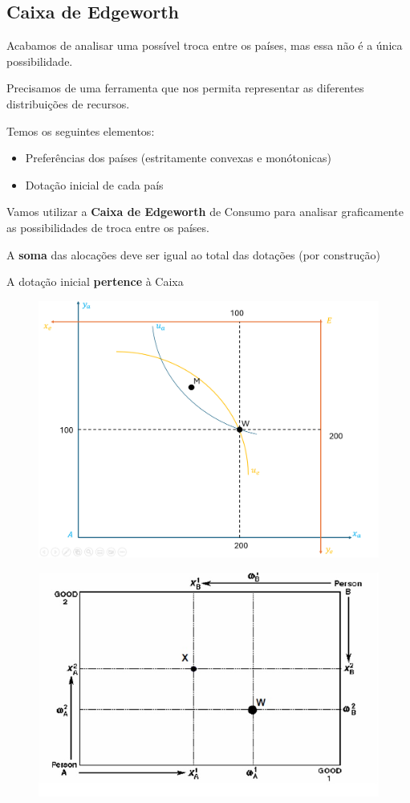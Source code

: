 \documentclass[a4paper,12pt]{article}[abntex2]
\begin{document}
\subsection{\textbf{Caixa de Edgeworth}}

Acabamos de analisar uma possível troca entre os países, mas essa não é a única possibilidade.

Precisamos de uma ferramenta que nos permita representar as diferentes distribuições de recursos.

Temos os seguintes elementos:
\begin{itemize}
    \item Preferências dos países (estritamente convexas e monótonicas)
    \item Dotação inicial de cada país
\end{itemize}

Vamos utilizar a \textbf{Caixa de Edgeworth} de Consumo para analisar graficamente as possibilidades de troca entre os países.


A \textbf{soma} das alocações deve ser igual ao total das dotações (por construção)

A dotação inicial \textbf{pertence} à Caixa

\begin{figure}[H]
    \centering
    \includegraphics[width=0.70\linewidth]{Imagens/a2i11.png}
\end{figure}

\begin{figure}[H]
    \centering
    \includegraphics[width=0.70\linewidth]{Imagens/a2i1.png}
\end{figure}
\end{document}

